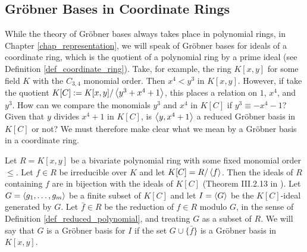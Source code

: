 \subsection{Gr\"obner Bases in Coordinate Rings}

While the theory of Gr\"obner bases always takes place in polynomial rings,
in Chapter \ref{chap_representation}, we will speak of Gr\"obner bases for ideals of a coordinate ring,
which is the quotient of a polynomial ring by a prime ideal (see Definition \ref{def_coordinate_ring}).
Take, for example, the ring $K[x,y]$ for some field $K$ with the $C_{3,4}$ monomial order.
Then $x^4 < y^3$ in $K[x,y]$.
However, if take the quotient $K[C] := K[x,y]/\left\langle y^3 + x^4 + 1 \right\rangle$,
this places a relation on $1$, $x^4$, and $y^3$.
How can we compare the monomials $y^3$ and $x^4$ in $K[C]$ if $y^3 \equiv -x^4 - 1$?
Given that $y$ divides $x^4 + 1$ in $K[C]$, is $\left\langle y, x^4 + 1 \right\rangle$ a reduced Gr\"obner basis in $K[C]$ or not?
We must therefore make clear what we mean by a Gr\"obner basis in a coordinate ring.

Let $R = K[x,y]$ be a bivariate polynomial ring with some fixed monomial order $\leq$.
Let $f \in R$ be irreducible over $K$ and let $K[C] = R/\left\langle f \right\rangle$.
Then the ideals of $R$ containing $f$ are in bijection with the ideals of $K[C]$
(Theorem III.2.13 in \cite{hungerford}).
Let $G = \left\langle g_1, \ldots, g_m \right\rangle$ be a finite subset of $K[C]$
and let $I = \left\langle G \right\rangle$ be the $K[C]$-ideal generated by $G$.
Let $\bar f \in R$ be the reduction of $f \in R$ modulo $G$, in the sense of Definition \ref{def_reduced_polynomial},
and treating $G$ as a subset of $R$.
We will say that $G$ is a Gr\"obner basis for $I$ if the set $G \cup \{ \bar f \}$ is a Gr\"obner basis in $K[x,y]$.

